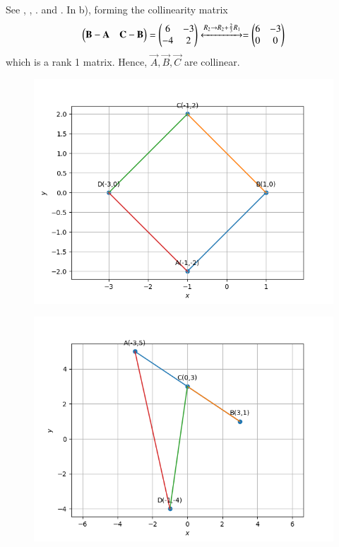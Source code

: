 	See ,
	, .
	and 
	. 
In b), forming the collinearity matrix
\begin{align}
\begin{pmatrix}\mathbf{B}-\mathbf{A} & \mathbf{C}-\mathbf{B}\end{pmatrix} 
=
		\begin{pmatrix}6&-3\\-4&2\end{pmatrix} \xleftrightarrow{R_{2}\rightarrow R_{2}+\frac{2}{3}R_{1}}= \begin{pmatrix}6&-3\\0&0\end{pmatrix}
\end{align}
which is a rank 1 matrix.  Hence, $\vec{A}, \vec{B}, \vec{C}$  are collinear.
\begin{figure}[!ht]
	\begin{center} 
	    \includegraphics[width=\columnwidth]{chapters/10/7/1/6/figs/quad1}
	\end{center}
\caption{}
\label{fig:10/7/1/6/Fig1}
\end{figure}
%
\begin{figure}[!h]
	\begin{center} 
	    \includegraphics[width=\columnwidth]{chapters/10/7/1/6/figs/quad2}
	\end{center}
\caption{}
\label{fig:10/7/1/6/Fig2}
\end{figure}
